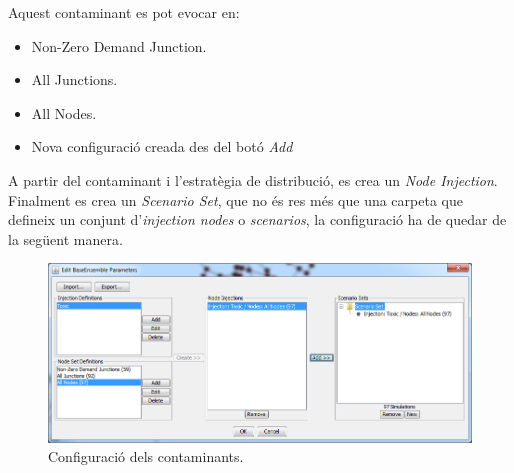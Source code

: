 \documentclass[12pt]{article}
\begin{document}
Aquest contaminant es pot evocar en:
\begin{itemize}
	\item Non-Zero Demand Junction.
	\item All Junctions.
	\item All Nodes.
	\item Nova configuració creada des del botó \textit{Add}
\end{itemize}
A partir del contaminant i l'estratègia de distribució, es crea un \textit{Node Injection}. Finalment es crea un \textit{Scenario Set}, que no és res més que una carpeta que defineix un conjunt d'\textit{injection nodes} o \textit{scenarios}, la configuració ha de quedar de la següent manera.
\begin{figure}[h!]
	\centering
	\includegraphics[scale=.6]{imatges/teva-spot/6.png}
	\caption{Configuració dels contaminants.}
\end{figure}
\pagebreak
\end{document}
